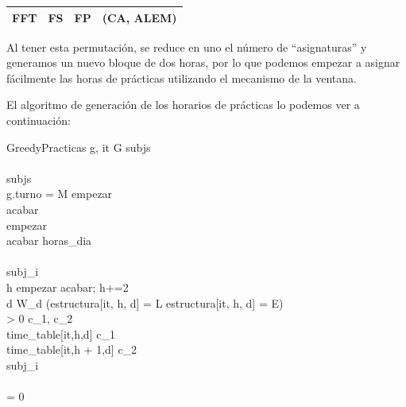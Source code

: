 \begin{center}
\begin{tabular}{|c|c|c|c|}
\hline
FFT & FS & FP & (CA, ALEM)\\
\hline
\end{tabular}
\end{center}

Al tener esta permutación, se reduce en uno el número de ``asignaturas'' y generamos un nuevo bloque de dos horas, por lo que podemos empezar a asignar fácilmente las horas de prácticas utilizando el mecanismo de la ventana.

El algoritmo de generación de los horarios de prácticas lo podemos ver a continuación:

\begin{pseudocode}{GreedyPracticas}{ }
\label{greedypracticas}
\FOREACH g, it \in G
\BEGIN
  subjs \GETS {}\\
  \\
  subjs \GETS {}\\

  \IF g.turno = M \THEN
  \BEGIN
    empezar  \\
    acabar \GETS {}\\
  \END
  \ELSE 
  \BEGIN
    empezar \GETS {}\\
    acabar \GETS horas\_dia\\
  \END\\

  subj_i \GETS {} \\

  \FOR h \GETS empezar \TO acabar; h+=2\\
  \BEGIN
    \FOR d  \TO W_d
    \BEGIN
      \IF (estructura[it, h, d] = L \OR estructura[it, h, d] = E) \\
        \AND {} > 0 \THEN
      \BEGIN
        c_1, c_2 \GETS {}\\
        time\_table[it,h,d] \GETS c_1\\
        time\_table[it,h + 1,d] \GETS c_2\\

        subj_i \GETS {}\\
      \END
    \END\\
    \IF {} = 0 \THEN \BREAK\\
  \END 
\END
\end{pseudocode}


